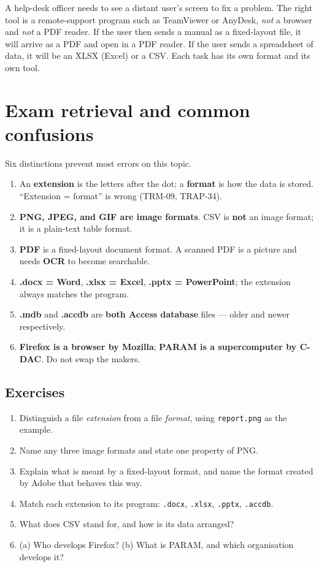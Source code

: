 \begin{example}
A help-desk officer needs to see a distant user's screen to fix a problem.
The right tool is a remote-support program such as TeamViewer or AnyDesk,
\emph{not} a browser and \emph{not} a PDF reader. If the user then sends a
manual as a fixed-layout file, it will arrive as a PDF and open in a PDF
reader. If the user sends a spreadsheet of data, it will be an XLSX (Excel)
or a CSV. Each task has its own format and its own tool.
\end{example}

\section{Exam retrieval and common confusions}
Six distinctions prevent most errors on this topic.
\begin{enumerate}
  \item An \textbf{extension} is the letters after the dot; a \textbf{format}
    is how the data is stored. ``Extension = format'' is wrong (TRM-09,
    TRAP-34).
  \item \textbf{PNG, JPEG, and GIF are image formats}. CSV is \textbf{not} an
    image format; it is a plain-text table format.
  \item \textbf{PDF} is a fixed-layout document format. A scanned PDF is a
    picture and needs \textbf{OCR} to become searchable.
  \item \textbf{.docx = Word}, \textbf{.xlsx = Excel}, \textbf{.pptx =
    PowerPoint}; the extension always matches the program.
  \item \textbf{.mdb} and \textbf{.accdb} are \textbf{both Access database}
    files --- older and newer respectively.
  \item \textbf{Firefox is a browser by Mozilla}; \textbf{PARAM is a
    supercomputer by C-DAC}. Do not swap the makers.
\end{enumerate}

\subsection*{Exercises}
\begin{enumerate}[label=\arabic*.]
  \item Distinguish a file \emph{extension} from a file \emph{format}, using
    \texttt{report.png} as the example.
  \item Name any three image formats and state one property of PNG.
  \item Explain what is meant by a fixed-layout format, and name the format
    created by Adobe that behaves this way.
  \item Match each extension to its program: \texttt{.docx},
    \texttt{.xlsx}, \texttt{.pptx}, \texttt{.accdb}.
  \item What does CSV stand for, and how is its data arranged?
  \item (a) Who develops Firefox? (b) What is PARAM, and which organisation
    develops it?
\end{enumerate}

